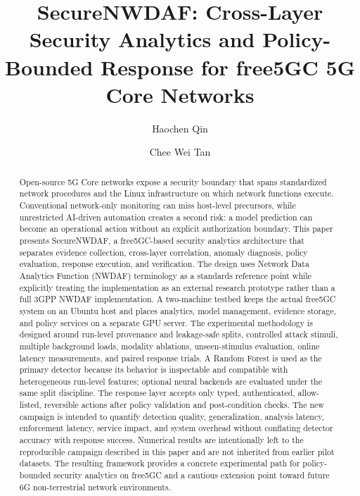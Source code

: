 \documentclass[sigconf,review]{acmart}
\begin{document}
\title{SecureNWDAF: Cross-Layer Security Analytics and Policy-Bounded Response for free5GC 5G Core Networks}

\author{Haochen Qin}

\author{Chee Wei Tan}

\begin{abstract}
Open-source 5G Core networks expose a security boundary that spans standardized network procedures and the Linux infrastructure on which network functions execute. Conventional network-only monitoring can miss host-level precursors, while unrestricted AI-driven automation creates a second risk: a model prediction can become an operational action without an explicit authorization boundary. This paper presents SecureNWDAF, a free5GC-based security analytics architecture that separates evidence collection, cross-layer correlation, anomaly diagnosis, policy evaluation, response execution, and verification. The design uses Network Data Analytics Function (NWDAF) terminology as a standards reference point while explicitly treating the implementation as an external research prototype rather than a full 3GPP NWDAF implementation. A two-machine testbed keeps the actual free5GC system on an Ubuntu host and places analytics, model management, evidence storage, and policy services on a separate GPU server. The experimental methodology is designed around run-level provenance and leakage-safe splits, controlled attack stimuli, multiple background loads, modality ablations, unseen-stimulus evaluation, online latency measurements, and paired response trials. A Random Forest is used as the primary detector because its behavior is inspectable and compatible with heterogeneous run-level features; optional neural backends are evaluated under the same split discipline. The response layer accepts only typed, authenticated, allow-listed, reversible actions after policy validation and post-condition checks. The new campaign is intended to quantify detection quality, generalization, analysis latency, enforcement latency, service impact, and system overhead without conflating detector accuracy with response success. Numerical results are intentionally left to the reproducible campaign described in this paper and are not inherited from earlier pilot datasets. The resulting framework provides a concrete experimental path for policy-bounded security analytics on free5GC and a cautious extension point toward future 6G non-terrestrial network environments.
\end{abstract}
\end{document}
